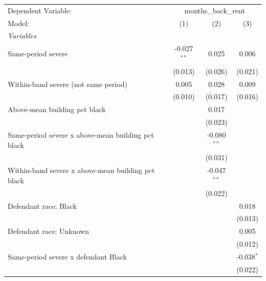\begingroup
\centering
\begin{tabular}{lccc}
   \tabularnewline \midrule \midrule
   Dependent Variable: & \multicolumn{3}{c}{months\_back\_rent}\\
   Model:                                             & (1)           & (2)           & (3)\\  
   \midrule
   \emph{Variables}\\
   Same-period severe                                 & -0.027$^{**}$ & 0.025         & 0.006\\   
                                                      & (0.013)       & (0.026)       & (0.021)\\   
   Within-band severe (not same period)               & 0.005         & 0.028         & 0.009\\   
                                                      & (0.010)       & (0.017)       & (0.016)\\   
   Above-mean building pct black                      &               & 0.017         &   \\   
                                                      &               & (0.023)       &   \\   
   Same-period severe x above-mean building pct black &               & -0.080$^{**}$ &   \\   
                                                      &               & (0.031)       &   \\   
   Within-band severe x above-mean building pct black &               & -0.047$^{**}$ &   \\   
                                                      &               & (0.022)       &   \\   
   Defendant race: Black                              &               &               & 0.018\\   
                                                      &               &               & (0.013)\\   
   Defendant race: Unknown                            &               &               & 0.005\\   
                                                      &               &               & (0.012)\\   
   Same-period severe x defendant Black               &               &               & -0.038$^{*}$\\   
                                                      &               &               & (0.022)\\   

\end{tabular}
